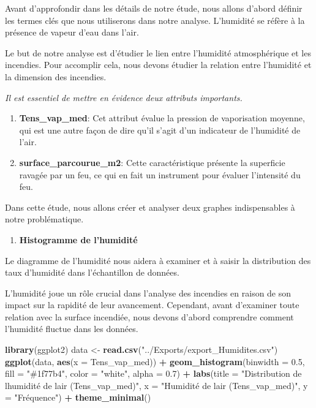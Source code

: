 \documentclass[
]{article}
\newenvironment{Shaded}{\begin{snugshade}}{\end{snugshade}}
\newcommand{\AttributeTok}[1]{\textcolor[rgb]{0.13,0.29,0.53}{#1}}
\newcommand{\FloatTok}[1]{\textcolor[rgb]{0.00,0.00,0.81}{#1}}
\newcommand{\FunctionTok}[1]{\textcolor[rgb]{0.13,0.29,0.53}{\textbf{#1}}}
\newcommand{\NormalTok}[1]{#1}
\newcommand{\OtherTok}[1]{\textcolor[rgb]{0.56,0.35,0.01}{#1}}
\newcommand{\SpecialCharTok}[1]{\textcolor[rgb]{0.81,0.36,0.00}{\textbf{#1}}}
\newcommand{\StringTok}[1]{\textcolor[rgb]{0.31,0.60,0.02}{#1}}
\providecommand{\tightlist}{%
  \setlength{\itemsep}{0pt}\setlength{\parskip}{0pt}}
\begin{document}
Avant d'approfondir dans les détails de notre étude, nous allons d'abord
définir les termes clés que nous utiliserons dans notre analyse.
L'humidité se réfère à la présence de vapeur d'eau dans l'air.

Le but de notre analyse est d'étudier le lien entre l'humidité
atmosphérique et les incendies. Pour accomplir cela, nous devons étudier
la relation entre l'humidité et la dimension des incendies.

\emph{Il est essentiel de mettre en évidence deux attributs importants.}

\begin{enumerate}
\def\labelenumi{\arabic{enumi}.}
\item
  \textbf{Tens\_vap\_med}: Cet attribut évalue la pression de
  vaporisation moyenne, qui est une autre façon de dire qu'il s'agit
  d'un indicateur de l'humidité de l'air.
\item
  \textbf{surface\_parcourue\_m2}: Cette caractéristique présente la
  superficie ravagée par un feu, ce qui en fait un instrument pour
  évaluer l'intensité du feu.
\end{enumerate}

Dans cette étude, nous allons créer et analyser deux graphes
indispensables à notre problématique.

\begin{enumerate}
\def\labelenumi{\arabic{enumi}.}
\tightlist
\item
  \textbf{Histogramme de l'humidité}
\end{enumerate}

Le diagramme de l'humidité nous aidera à examiner et à saisir la
distribution des taux d'humidité dans l'échantillon de données.

L'humidité joue un rôle crucial dans l'analyse des incendies en raison
de son impact sur la rapidité de leur avancement. Cependant, avant
d'examiner toute relation avec la surface incendiée, nous devons d'abord
comprendre comment l'humidité fluctue dans les données.

\begin{Shaded}
\begin{Highlighting}[]
\FunctionTok{library}\NormalTok{(ggplot2)}
\NormalTok{data }\OtherTok{\textless{}{-}} \FunctionTok{read.csv}\NormalTok{(}\StringTok{"../Exports/export\_Humidites.csv"}\NormalTok{)}
\FunctionTok{ggplot}\NormalTok{(data, }\FunctionTok{aes}\NormalTok{(}\AttributeTok{x =}\NormalTok{ Tens\_vap\_med)) }\SpecialCharTok{+}
  \FunctionTok{geom\_histogram}\NormalTok{(}\AttributeTok{binwidth =} \FloatTok{0.5}\NormalTok{, }\AttributeTok{fill =} \StringTok{"\#1f77b4"}\NormalTok{, }\AttributeTok{color =} \StringTok{"white"}\NormalTok{, }\AttributeTok{alpha =} \FloatTok{0.7}\NormalTok{) }\SpecialCharTok{+}
  \FunctionTok{labs}\NormalTok{(}\AttributeTok{title =} \StringTok{"Distribution de l\textquotesingle{}humidité de l\textquotesingle{}air (Tens\_vap\_med)"}\NormalTok{, }
       \AttributeTok{x =} \StringTok{"Humidité de l\textquotesingle{}air (Tens\_vap\_med)"}\NormalTok{, }
       \AttributeTok{y =} \StringTok{"Fréquence"}\NormalTok{) }\SpecialCharTok{+}
  \FunctionTok{theme\_minimal}\NormalTok{()}
\end{Highlighting}
\end{Shaded}
\end{document}
